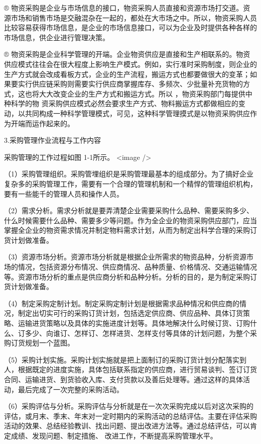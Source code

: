     ® 物资采购是企业与市场信息的接口，物资采购人员直接和资源市场打交道。资源市场和销售市场是交融混杂在一起的，都处在大市场之中。所以，物资采购人员比较容易获得市场信息，是企业的市场信息接口，可以为企业及时提供各种各样的市场信息，供企业进行管理决策。

    ® 物资采购是企业科学管理的开端。企业物资供应是直接和生产相联系的。物资供应模式往往会在很大程度上影响生产模式。例如，实行准时采购制度，则企业的生产方式就会改成看板方式，企业的生产流程，搬运方式也都要做很大的变革；如果要实行供应链采购则需要实行供应商掌握库存、多频次、少批量补充货物的方式，这也将大大改变企业的生产方式和搬运方式。所以 ，物资采购部门每提供中种科学的物
资采购供应模式必然会要求生产方式、物料搬运方式都做相应的变动，以共同构成一种科学管理模式，可见，这种科学管理摸式是以物资采购供应作为开端而运作起来的。

3.采购管理作业流程与工作内容

    采购管理的工作过程如图 1-1所示。
    <image />

    （1）采购管理组织。采购管埋组织是采购管理最基本的组成部分。为了搞好企业复杂多的采购管理工作，需要有一个合理的管理机制和一个精悍的管理组织机构，要有一些能千的管理人员和操作人员。

    （2）需求分析。需求分析就是要弄清楚企业需要采购什么品种、需要采购多少、什么时候需要什么品种、需要多少等问题。作为全企业的物资采购供应部门，应当掌握全企业的物资需求情况并制定物料需求计划，从而为制定出科学合理的采购订货计划做准备。

    （3）资源市场分析。资源市场分析就是根据企业所需求的物资品种，分析资源市场的情况，包括资源分布情况、供应商情况、品种质量、价格情况、交通运输情况等。资源市场分析的重点是供应商分析和品种分析。分析的目的，是为制定采购订货计划做准备。

    （4）制定采购定制计划。制定采购定制计划是根据需求品种情况和供应商的情况，制定出切实可行的采购订货计划，包括选定供应商、供应品种、具体订货策略、运输进货策略以及具体的实施进度计划等。具体地解决什么时候订货、订购什么、订多少、向谁订、怎样订、怎样进货、怎样支付等具体的计划问题，为整个采购订货规划一个蓝图。

    （5）采购计划实施。采购计划实施就是把上面制订的采购订货计划分配落实到人，根据既定的进度实施，具体包括联系指定的供应商，进行贸易谈判、签订订货合同、运输进货、到货验收入库、支付货款以及善后处理等。通过这样的具体活动，最后完成了一次完整的采购活动。

    （6）采购评估与分析。采购评估与分析就是在一次次采购完成以后对这次采购的评估，或月末、季末、年末对一定时期内的采购活动的总结评估。主要在评估采购活动的效果、总结经验教训、找出问题、提出改进方法等。通过总结评估，可以肯定成绩、发现问题、制定措施、 改进工作，不断提高采购管理水平。

